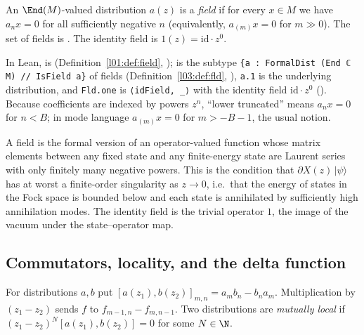 \begin{definition}\label{ch07:def:field}
An $\End(M)$-valued distribution $a(z)$ is a \emph{field} if for every $x\in M$ we have
$a_n x = 0$ for all sufficiently negative $n$ (equivalently, $a_{(m)}x = 0$ for $m\gg0$). The
set of fields is . The identity field is $1(z) = \mathrm{id}\cdot z^0$.
\end{definition}

In Lean,  is
 (Definition~\ref{l01:def:field}, );
 is the subtype \verb|{a : FormalDist (End ℂ M) // IsField a}| of fields
(Definition~\ref{l03:def:fld}, ), \verb|a.1| is the underlying
distribution, and \verb|Fld.one| is \verb|⟨idField, _⟩| with  the identity field
$\mathrm{id}\cdot z^0$ (). Because coefficients are indexed by
powers $z^n$, ``lower truncated'' means $a_n x = 0$ for $n < B$; in mode language
$a_{(m)} x = 0$ for $m > -B-1$, the usual notion.

\begin{physics}
A field is the formal version of an operator-valued function whose matrix elements between any fixed state and any finite-energy state are Laurent series with only finitely many negative powers. This is the condition that $\partial X(z)\,|\psi\rangle$ has at worst a finite-order singularity as $z\to0$, i.e.\ that the energy of states in the Fock space is bounded below and each state is annihilated by sufficiently high annihilation modes. The identity field is the trivial operator $1$, the image of the vacuum under the state--operator map.
\end{physics}

\subsection{Commutators, locality, and the delta function}\label{ch07:sec:local}

\begin{definition}
\label{ch07:def:local}
For distributions $a, b$ put $[a(z_1),b(z_2)]_{m,n} = a_m b_n - b_n a_m$. Multiplication by
$(z_1-z_2)$ sends $f$ to $f_{m-1,n} - f_{m,n-1}$. Two distributions are \emph{mutually local}
if $(z_1-z_2)^N[a(z_1),b(z_2)] = 0$ for some $N\in\N$.
\end{definition}

